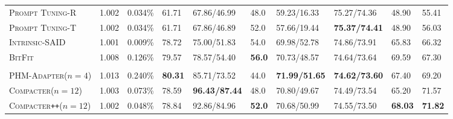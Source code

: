 \documentclass{article}
\newcommand{\compacter}{\textsc{Compacter}\xspace}
\newcommand{\compacteronlyff}{\textsc{Compacter}\texttt{++}\xspace} %
\newcommand{\phmadapter}{\textsc{PHM-Adapter}\xspace}
\newcommand{\intrinsic}{\textsc{Intrinsic-SAID}\xspace}
\newcommand{\prompttuningrandom}{\textsc{Prompt Tuning-R}\xspace}
\newcommand{\prompttuningtokens}{\textsc{Prompt Tuning-T}\xspace}
\newcommand{\bitfit}{\textsc{BitFit}\xspace}
\begin{document}
\begin{table}[tp]
\begin{adjustbox}{max width=\textwidth}
\begin{tabular}{l@{\hskip 0.02in}|l@{\hskip 0.06in}l@{\hskip 0.0in}|l@{\hskip 0.08in}l@{\hskip 0.08in}l@{\hskip 0.08in}l@{\hskip 0.08in}l@{\hskip 0.08in}l@{\hskip 0.08in}|l}
\prompttuningrandom &1.002 & 0.034\%& 61.71 &  67.86/46.99 &            48.0 &       59.23/16.33 &      75.27/74.36 &           48.90 &  55.41 \\ 
\prompttuningtokens &1.002 & 0.034\%&  61.71 &  67.86/46.89 &            52.0 &       57.66/19.44 &      \textbf{75.37/74.41} &           48.90 &  56.03 \\
\midrule 
\intrinsic &1.001& 0.009\%&  78.72 &   75.00/51.83 &            54.0 &       69.98/52.78 &      74.86/73.91 &          65.83 &  66.32 \\ %
\bitfit &1.008&0.126\%& 79.57 &   78.57/54.40 &            \textbf{56.0} &       70.73/48.57 &      74.64/73.64 &          69.59 &  67.30 \\
\midrule 
\rowcolor{gray!20}\multicolumn{10}{c}{\it \textbf{Our Proposed Methods}}\\
\midrule 
\phmadapter ($n=4$)& 1.013 &0.240\% & \textbf{80.31} &  85.71/73.52 &            44.0 &       \textbf{71.99/51.65} &       \textbf{74.62/73.60} &          67.40 &  69.20\\
\midrule 
\compacter ($n=12$)&1.003& 0.073\%&  78.59 &  \textbf{96.43/87.44} &            48.0 &        70.80/49.67 &   74.49/73.54       & 65.20 & 71.57\\
\midrule 
\compacteronlyff ($n=12$)& 1.002&  0.048\%&            78.84 &  92.86/84.96 &            \textbf{52.0} &       70.68/50.99 &       74.55/73.50 &          \textbf{68.03} &  \textbf{71.82} \\
\bottomrule
\end{tabular}
\end{adjustbox}
\label{tab:superglue_results} \vspace{-1em}
\end{table} 
\end{document}
